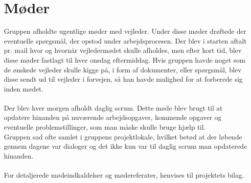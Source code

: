 \section{Møder}
Gruppen afholdte ugentlige møder med vejleder. Under disse møder drøftede der eventuelle spørgsmål, der opstod under arbejdsprocesen.
Der blev i starten aftalt pr. mail hvor og hvornår vejledermødet skulle afholdes, men efter kort tid, blev disse møder fastlagt til hver onsdag eftermiddag.
Hvis gruppen havde noget som de ønskede vejleder skulle kigge på, i form af dokumenter, eller spørgsmål, blev disse sendt ud til vejleder i forvejen, så han havde mulighed for at forberede sig inden mødet. \\ \\
Der blev hver morgen afholdt daglig scrum\cite{Scrum}. Dette møde blev brugt til at opdatere hinanden på nuværende arbejdsopgaver, kommende opgaver og eventuelle problemstillinger, som man måske skulle bruge hjælp til. \\
Gruppen sad ofte samlet i gruppens projektlokale, hvilket betød at der løbende gennem dagene var dialoger og det ikke kun var til daglig scrum man opdaterede hinanden. \\ \\
For detaljerede mødeindkaldelser og mødereferater, henvises til projektets bilag. \\

